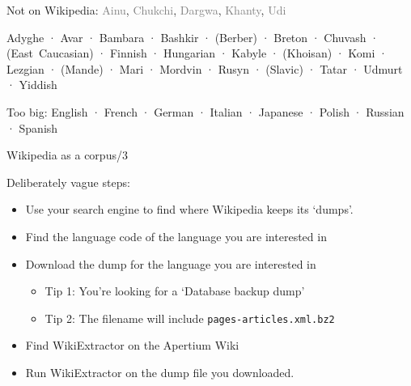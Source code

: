 \documentclass[10pt, compress]{beamer}
\begin{document}
\begin{frame}[standout]


{\small
Not on Wikipedia:  \textcolor{gray}{Ainu}, \textcolor{gray}{Chukchi}, \textcolor{gray}{Dargwa}, \textcolor{gray}{Khanty}, \textcolor{gray}{Udi}
}

Adyghe ·  Avar · Bambara · Bashkir · (Berber) · Breton · Chuvash · (East~Caucasian) · Finnish · Hungarian · Kabyle · (Khoisan) · Komi · Lezgian · (Mande) · Mari · Mordvin · Rusyn · (Slavic) · Tatar · Udmurt · Yiddish

{\small 
Too big: English ·  French ·
German · Italian · Japanese · Polish · Russian · Spanish
}

\end{frame}

\begin{frame}{Wikipedia as a corpus/3}

Deliberately vague steps:

\begin{itemize}
  \item Use your search engine to find where Wikipedia keeps its `dumps'.
  \item Find the language code of the language you are interested in
  \item Download the dump for the language you are interested in
  \begin{itemize}
    \item Tip 1: You're looking for a `Database backup dump'
    \item Tip 2: The filename will include {\tt pages-articles.xml.bz2}
  \end{itemize}
  \item Find WikiExtractor on the Apertium Wiki
  \item Run WikiExtractor on the dump file you downloaded. 
\end{itemize}

\end{frame}
\end{document}
